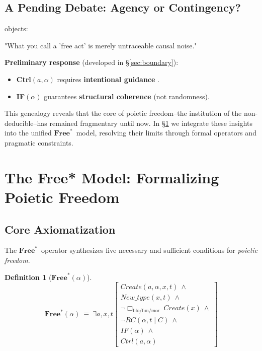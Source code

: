 \documentclass[11pt,a4paper]{article}
\newtheorem{definition}{Definition}
\newcommand{\Free}{\ensuremath{\mathbf{Free}^{\ast}}}
\begin{document}
\subsection{A Pending Debate: Agency or Contingency?}\label{sec:soa-dilemma}

\cite{dennett2022} objects:

"What you call a 'free act' is merely untraceable causal noise." \cite[p. 73]{dennett2022}

\textbf{Preliminary response} (developed in \S\ref{sec:boundary}):
\begin{itemize}
  \item \textbf{Ctrl\((a,\alpha)\)} requires \textbf{intentional guidance} \cite{fischer1998}.
  \item \textbf{IF\((\alpha)\)} guarantees \textbf{structural coherence} (not randomness).
\end{itemize}

This genealogy reveals that the core of poietic freedom--the institution of the non-deducible--has remained fragmentary until now. In \S\ref{sec:model} we integrate these insights into the unified \Free\ model, resolving their limits through formal operators and pragmatic constraints.

\section{The Free* Model: Formalizing Poietic Freedom}\label{sec:model}

\subsection{Core Axiomatization}\label{sec:model-axioms}

The \Free\ operator synthesizes five necessary and sufficient conditions for \emph{poietic freedom}.

\begin{definition}[\Free\((\alpha)\)]
\[
\textbf{Free}^{*}(\alpha)\ \equiv\ \exists a,x,t\left[\begin{array}{c}Create(a, \alpha,x,t)\ \wedge\\ New\_type(x,t)\ \wedge\\ \neg\Box_{\text{blo/fun/mor}}\ Create(x)\ \wedge\\ \neg RC(\alpha,t\mid C)\ \wedge\\ IF(\alpha)\ \wedge\\ \textit{Ctrl}(a,\alpha)\end{array}\right]
\]
\end{definition}
\end{document}
